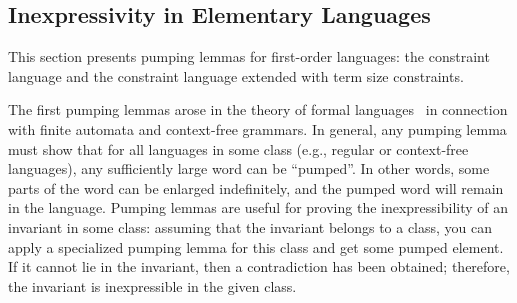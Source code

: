 



\subsection{Inexpressivity in Elementary Languages}
This section presents pumping lemmas for first-order languages: the constraint language and the constraint language extended with term size constraints.


The first pumping lemmas arose in the theory of formal languages~\cite{BARHILLELPERLESSHAMIR} in connection with finite automata and context-free grammars.
In general, any pumping lemma must show that for all languages in some class (e.g., regular or context-free languages), any sufficiently large word can be ``pumped''. In other words, some parts of the word can be enlarged indefinitely, and the pumped word will remain in the language. Pumping lemmas are useful for proving the inexpressibility of an invariant in some class: assuming that the invariant belongs to a class, you can apply a specialized pumping lemma for this class and get some pumped element. If it cannot lie in the invariant, then a contradiction has been obtained; therefore, the invariant is inexpressible in the given class.

